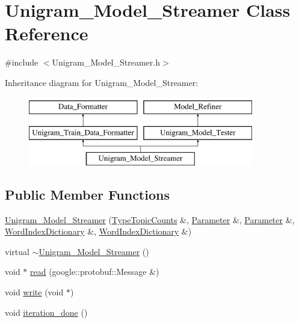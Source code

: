\hypertarget{class_unigram___model___streamer}{
\section{Unigram\_\-Model\_\-Streamer Class Reference}
\label{class_unigram___model___streamer}
}


{\ttfamily \#include $<$Unigram\_\-Model\_\-Streamer.h$>$}

Inheritance diagram for Unigram\_\-Model\_\-Streamer:\begin{figure}[H]
\begin{center}
\leavevmode
\includegraphics[height=3cm]{class_unigram___model___streamer}
\end{center}
\end{figure}
\subsection*{Public Member Functions}
\begin{DoxyCompactItemize}
\item 
\hyperlink{class_unigram___model___streamer_a43e7f046831bcd22ac0b16fb6f39aacb}{Unigram\_\-Model\_\-Streamer} (\hyperlink{class_type_topic_counts}{TypeTopicCounts} \&, \hyperlink{struct_parameter}{Parameter} \&, \hyperlink{struct_parameter}{Parameter} \&, \hyperlink{class_word_index_dictionary}{WordIndexDictionary} \&, \hyperlink{class_word_index_dictionary}{WordIndexDictionary} \&)
\item 
virtual \hyperlink{class_unigram___model___streamer_a80613d9c8c9a500875c3fadc5f0ea595}{$\sim$Unigram\_\-Model\_\-Streamer} ()
\item 
void $\ast$ \hyperlink{class_unigram___model___streamer_a8a092c8036f7eb09b76b200fb5524ea0}{read} (google::protobuf::Message \&)
\item 
void \hyperlink{class_unigram___model___streamer_a236395088d23966ec59a85582e4d470f}{write} (void $\ast$)
\item 
void \hyperlink{class_unigram___model___streamer_a60124013b5da9fabc486558801fa3ab4}{iteration\_\-done} ()
\end{DoxyCompactItemize}
